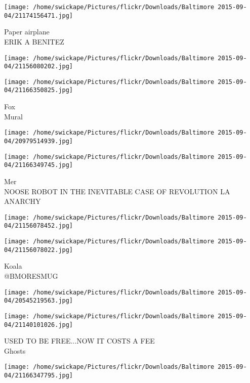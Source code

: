 \documentclass[10pt,letterpaper]{article}
\begin{document}
\vspace{0.25in}
\texttt{[image: /home/swickape/Pictures/flickr/Downloads/Baltimore 2015-09-04/21174156471.jpg]}

Paper airplane\\
ERIK A BENITEZ\\
\pagebreak

\texttt{[image: /home/swickape/Pictures/flickr/Downloads/Baltimore 2015-09-04/21156080202.jpg]}

\vspace{0.25in}
\texttt{[image: /home/swickape/Pictures/flickr/Downloads/Baltimore 2015-09-04/21166350825.jpg]}

Fox\\
Mural\\
\pagebreak

\texttt{[image: /home/swickape/Pictures/flickr/Downloads/Baltimore 2015-09-04/20979514939.jpg]}

\vspace{0.25in}
\texttt{[image: /home/swickape/Pictures/flickr/Downloads/Baltimore 2015-09-04/21166349745.jpg]}

Mer\\
NOOSE ROBOT IN THE INEVITABLE CASE OF REVOLUTION LA ANARCHY\\
\pagebreak

\texttt{[image: /home/swickape/Pictures/flickr/Downloads/Baltimore 2015-09-04/21156078452.jpg]}

\vspace{0.25in}
\texttt{[image: /home/swickape/Pictures/flickr/Downloads/Baltimore 2015-09-04/21156078022.jpg]}

Koala\\
@BMORESMUG\\
\pagebreak

\texttt{[image: /home/swickape/Pictures/flickr/Downloads/Baltimore 2015-09-04/20545219563.jpg]}

\vspace{0.25in}
\texttt{[image: /home/swickape/Pictures/flickr/Downloads/Baltimore 2015-09-04/21140101026.jpg]}

USED TO BE FREE...NOW IT COSTS A FEE\\
Ghosts\\
\pagebreak

\texttt{[image: /home/swickape/Pictures/flickr/Downloads/Baltimore 2015-09-04/21166347795.jpg]}
\end{document}
